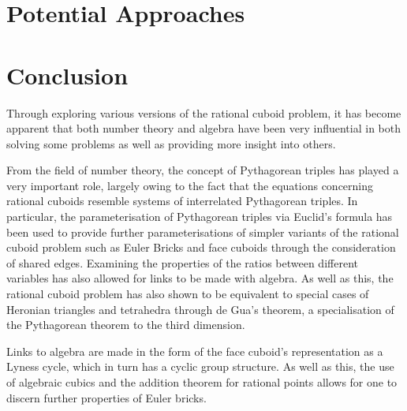 \documentclass[11pt]{article}
\begin{document}
\section{Potential Approaches}


\section{Conclusion}
Through exploring various versions of the rational cuboid problem, it has become apparent that both number theory and algebra have been very influential in both solving some problems as well as providing more insight into others. 

From the field of number theory, the concept of Pythagorean triples has played a very important role, largely owing to the fact that the equations concerning rational cuboids resemble systems of interrelated Pythagorean triples. In particular, the parameterisation of Pythagorean triples via Euclid's formula has been used to provide further parameterisations of simpler variants of the rational cuboid problem such as Euler Bricks and face cuboids through the consideration of shared edges. Examining the properties of the ratios between different variables has also allowed for links to be made with algebra. As well as this, the rational cuboid problem has also shown to be equivalent to special cases of Heronian triangles and tetrahedra through de Gua's theorem, a specialisation of the Pythagorean theorem to the third dimension.

Links to algebra are made in the form of the face cuboid's representation as a Lyness cycle, which in turn has a cyclic group structure. As well as this, the use of algebraic cubics and the addition theorem for rational points allows for one to discern further properties of Euler bricks.

\newpage

 
\end{document}
